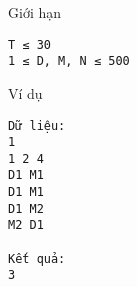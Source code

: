 Giới hạn  
\begin{verbatim}
T ≤ 30
1 ≤ D, M, N ≤ 500
\end{verbatim}
   Ví dụ  
\begin{verbatim}
Dữ liệu:
1
1 2 4
D1 M1
D1 M1
D1 M2
M2 D1

Kết quả:
3

\end{verbatim}